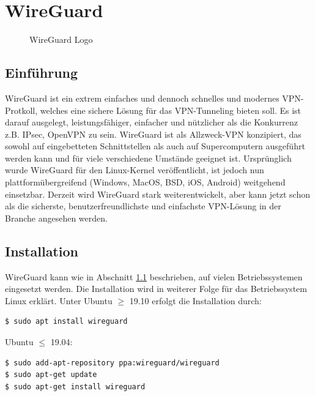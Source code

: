 
\chapter{WireGuard}
\begin{figure}[htbp]
  \centering
  
  \caption{WireGuard Logo}
\end{figure}

\section{Einführung} %
\label{einfuehrung}
WireGuard ist ein extrem einfaches und dennoch schnelles und modernes VPN-Protkoll, welches eine sichere Lösung für das VPN-Tunneling bieten soll. Es ist darauf ausgelegt, leistungsfähiger, einfacher und nützlicher als die Konkurrenz z.B. IPsec, OpenVPN  zu sein. WireGuard ist als Allzweck-VPN konzipiert, das sowohl auf eingebetteten Schnittstellen als auch auf Supercomputern ausgeführt werden kann und für viele verschiedene Umstände geeignet ist.  \newline\newline
Ursprünglich wurde WireGuard für den Linux-Kernel veröffentlicht, ist jedoch nun plattformübergreifend (Windows, MacOS, BSD, iOS, Android) weitgehend einsetzbar. Derzeit wird WireGuard stark weiterentwickelt, aber kann jetzt schon als die sicherste, benutzerfreundlichste und einfachste VPN-Lösung in der Branche angesehen werden.

\section{Installation} 
\label{installation}
WireGuard kann wie in Abschnitt \ref{einfuehrung} beschrieben, auf vielen Betriebssystemen eingesetzt werden. Die Installation wird in weiterer Folge für das Betriebssystem Linux erklärt. \newline\newline
Unter Ubuntu $\geq$ 19.10 erfolgt die Installation durch:
\begin{lstlisting}
$ sudo apt install wireguard
\end{lstlisting}
Ubuntu $\leq$ 19.04:
\begin{lstlisting}
$ sudo add-apt-repository ppa:wireguard/wireguard
$ sudo apt-get update
$ sudo apt-get install wireguard
\end{lstlisting}

